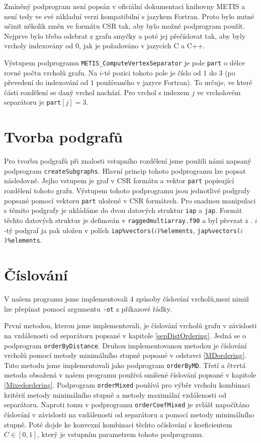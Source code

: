 \documentclass[11pt,american,czech,oneside]{book}
\theoremstyle{plain}
\theoremstyle{definition}
\begin{document}
Zmíněný podprogram není popsán v oficiální dokumentaci knihovny METIS a není tedy ve své základní verzi kompatibilní s jazykem Fortran. Proto bylo nutné učinit několik změn ve formátu CSR tak, aby bylo možné podprogram použít. Nejprve bylo třeba odebrat z grafu smyčky a poté jej přečíslovat tak, aby byly vrcholy indexovány od 0, jak je požadováno v jazycích C a C++.

Výstupem podprogramu \texttt{METIS\_ComputeVertexSeparator} je pole \texttt{part} o délce rovné počtu vrcholů grafu. Na $i$-té pozici tohoto pole je číslo od $1$ do $3$ (po převedení do indexování od $1$ používaného v jazyce Fortran). To určuje, ve které části rozdělení se daný vrchol nachází. Pro vrchol s indexem $j$ ve vrcholovém separátoru je \texttt{part}$[j] = 3$.

\section{Tvorba podgrafů}
Pro tvorbu podgrafů při znalosti vstupního rozdělení jsme použili námi napsaný podprogram \texttt{createSubgraphs}. Hlavní princip tohoto podprogramu lze popsat následovně. Jejho vstupem je graf v CSR formátu a vektor \texttt{part} popisující rozdělení tohoto grafu. Výstupem tohoto podprogramu jsou jednotlivé podgrafy popsané pomocí vektoru \texttt{part} uložené v CSR formátech. Pro snadnou manipulaci s těmito podgrafy je ukládáme do dvou datových struktur \texttt{iap} a \texttt{jap}. Formát těchto datových struktur je definován v \texttt{raggedmultiarray.f90} a byl převzat z \cite{ragmult}. $i$-tý podgraf ja pak uložen v polích \texttt{iap\%vectors($i$)\%elements}, \texttt{jap\%vectors($i$)\%elements}.


\section{Číslování}
V našem programu jsme implementovali 4 způsoby číslování vrcholů,mezi nimiž lze přepínat pomocí argumentu \texttt{-ot} z příkazové řádky.

První metodou, kterou jsme implementovali, je číslování vrcholů grafu v závislosti na vzdálenosti od separátoru popsané v kapitole \ref{sepDistOrdering}. Jedná se o podprogram \texttt{orderByDistance}. Druhou implementovanou metodou je číslování vrcholů pomocí metody minimálního stupně popsané v odstavci \ref{MDordering}. Tuto metodu jsme implementovali jako podprogram \texttt{orderByMD}. Třetí a čtvrtá metoda obsažená v našem programu používá smíšené číslování popsané v kapitole \ref{Mixedordering}. Podprogram \texttt{orderMixed} používá pro výběr vrcholu kombinaci kritérií metody minimálního stupně a metody maximální vzdálenosti od separátoru. Naproti tomu v podprogramu \texttt{orderCoefMixed} je zvlášť napočítáno číslování v závislosti na vzdálenosti od separátoru a pomocí metody minimálního stupně. Poté dojde ke konvexní kombinaci těchto očíslování s koeficientem $C \in [0,1]$, který je vstupním parametrem tohoto podprogramu.
\end{document}
